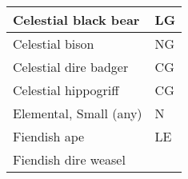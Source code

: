 \begin{longtable}{llll}
{\begin{minipage}[t]{3.326in}
Celestial black bear\end{minipage}} & \multicolumn{3}{p{0.601in}|}{\begin{minipage}[t]{0.601in}\raggedright
LG\end{minipage}}\\
\hline
\multicolumn{1}{|p{3.326in}|}{\begin{minipage}[t]{3.326in}\raggedright
Celestial bison\end{minipage}} & \multicolumn{3}{p{0.601in}|}{\begin{minipage}[t]{0.601in}\raggedright
NG\end{minipage}}\\
\hline
\multicolumn{1}{|p{3.326in}|}{\begin{minipage}[t]{3.326in}\raggedright
Celestial dire badger\end{minipage}} & \multicolumn{3}{p{0.601in}|}{\begin{minipage}[t]{0.601in}\raggedright
CG\end{minipage}}\\
\hline
\multicolumn{1}{|p{3.326in}|}{\begin{minipage}[t]{3.326in}\raggedright
Celestial hippogriff\end{minipage}} & \multicolumn{3}{p{0.601in}|}{\begin{minipage}[t]{0.601in}\raggedright
CG\end{minipage}}\\
\hline
\multicolumn{1}{|p{3.326in}|}{\begin{minipage}[t]{3.326in}\raggedright
Elemental, Small (any)\end{minipage}} & \multicolumn{3}{p{0.601in}|}{\begin{minipage}[t]{0.601in}\raggedright
N\end{minipage}}\\
\hline
\multicolumn{1}{|p{3.326in}|}{\begin{minipage}[t]{3.326in}\raggedright
Fiendish ape\end{minipage}} & \multicolumn{3}{p{0.601in}|}{\begin{minipage}[t]{0.601in}\raggedright
LE\end{minipage}}\\
\hline
\multicolumn{1}{|p{3.326in}|}{\begin{minipage}[t]{3.326in}\raggedright
Fiendish dire weasel\end{minipage}} & \multicolumn{3}{p{0.601in}|}{\begin{minipage}[t]{0.601in}\raggedright

\end{minipage}}
\end{longtable}
